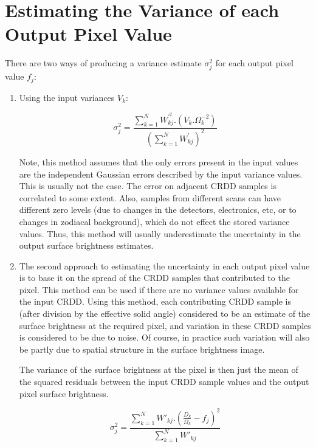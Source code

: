 \section{Estimating the Variance of each Output Pixel Value}
\label {SEC:VAR}
There are two ways of producing a variance estimate $\sigma^{2}_{j}$ for each
output pixel value $f_{j}$:

\begin{enumerate}

\item

Using the input variances $V_{k}$:

\begin{equation}
\sigma^{2}_{j}=\frac{\sum_{k=1}^{N} W^{\prime^{2}}_{kj}.(V_{k}.\Omega_{k}^{-2})}
{(\sum_{k=1}^{N}W^{\prime}_{kj})^{2}}
\label {EQ:SIGMAJ}
\end{equation}

Note, this method assumes that the only errors present in the input values are
the independent Gaussian errors described by the input variance values. This is
usually not the case. The error on adjacent CRDD samples is correlated to some
extent. Also, samples from different scans can have different zero levels (due
to changes in the detectors, electronics, etc, or to changes in zodiacal
background), which do not effect the stored variance values. Thus, this method
will usually underestimate the uncertainty in the output surface brightness
estimates.

\item

The second approach to estimating the uncertainty in each output pixel value
is to base it on the spread of the CRDD samples that contributed to the pixel.
This method can be used if there are no variance values available for the input
CRDD.
Using this method, each contributing CRDD sample is (after division by the
effective solid angle) considered to be an estimate of the surface brightness at
the required pixel, and variation in these CRDD samples is considered to be due
to noise. Of course, in practice such variation will also be partly due to
spatial structure in the surface brightness image.

The variance of the surface brightness at the pixel is then just the mean of
the squared residuals between the input CRDD sample values and the output pixel
surface brightness.

\begin{equation}
\sigma^{2}_{j}=\frac{\sum_{k=1}^{N}W\prime_{kj}.(\frac{D_{k}}{\Omega_{k}}-f_{j})^{2}}
{\sum_{k=1}^{N}W\prime_{kj}}
\end{equation}


\end{enumerate}
